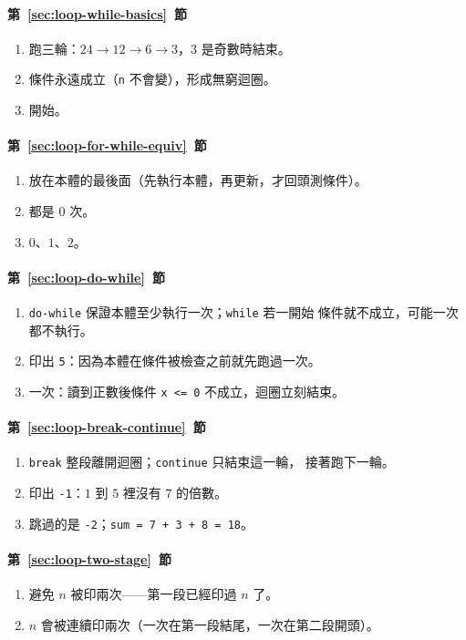 \paragraph{第~\ref{sec:loop-while-basics}~節}
\begin{enumerate}
\item 跑三輪：$24 \to 12 \to 6 \to 3$，$3$ 是奇數時結束。
\item 條件永遠成立（\texttt{n} 不會變），形成無窮迴圈。
\item 開始。
\end{enumerate}

\paragraph{第~\ref{sec:loop-for-while-equiv}~節}
\begin{enumerate}
\item 放在本體的最後面（先執行本體，再更新，才回頭測條件）。
\item 都是 $0$ 次。
\item $0$、$1$、$2$。
\end{enumerate}

\paragraph{第~\ref{sec:loop-do-while}~節}
\begin{enumerate}
\item \texttt{do-while} 保證本體至少執行一次；\texttt{while} 若一開始
條件就不成立，可能一次都不執行。
\item 印出 \texttt{5}：因為本體在條件被檢查之前就先跑過一次。
\item 一次：讀到正數後條件 \texttt{x <= 0} 不成立，迴圈立刻結束。
\end{enumerate}

\paragraph{第~\ref{sec:loop-break-continue}~節}
\begin{enumerate}
\item \texttt{break} 整段離開迴圈；\texttt{continue} 只結束這一輪，
接著跑下一輪。
\item 印出 \texttt{-1}：$1$ 到 $5$ 裡沒有 $7$ 的倍數。
\item 跳過的是 \texttt{-2}；\texttt{sum = 7 + 3 + 8 = 18}。
\end{enumerate}

\paragraph{第~\ref{sec:loop-two-stage}~節}
\begin{enumerate}
\item 避免 $n$ 被印兩次——第一段已經印過 $n$ 了。
\item $n$ 會被連續印兩次（一次在第一段結尾，一次在第二段開頭）。
\end{enumerate}

